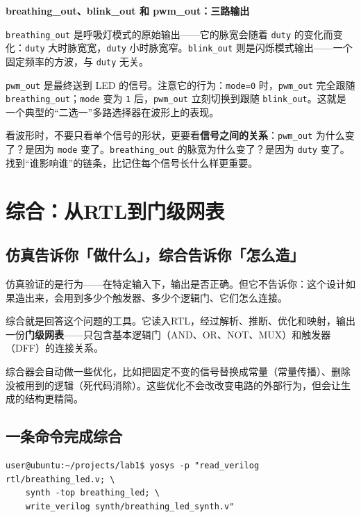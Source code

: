 \documentclass[11pt,a4paper]{article}
\begin{document}
\textbf{breathing\_out、blink\_out 和 pwm\_out：三路输出}

\texttt{breathing\_out} 是呼吸灯模式的原始输出——它的脉宽会随着 \texttt{duty} 的变化而变化：\texttt{duty} 大时脉宽宽，\texttt{duty} 小时脉宽窄。\texttt{blink\_out} 则是闪烁模式输出——一个固定频率的方波，与 \texttt{duty} 无关。

\texttt{pwm\_out} 是最终送到 LED 的信号。注意它的行为：\texttt{mode=0} 时，\texttt{pwm\_out} 完全跟随 \texttt{breathing\_out}；\texttt{mode} 变为 \texttt{1} 后，\texttt{pwm\_out} 立刻切换到跟随 \texttt{blink\_out}。这就是一个典型的``二选一''多路选择器在波形上的表现。

\begin{tipbox}
看波形时，不要只看单个信号的形状，更要看\textbf{信号之间的关系}：\texttt{pwm\_out} 为什么变了？是因为 \texttt{mode} 变了。\texttt{breathing\_out} 的脉宽为什么变了？是因为 \texttt{duty} 变了。找到``谁影响谁''的链条，比记住每个信号长什么样更重要。
\end{tipbox}

\section{综合：从RTL到门级网表}

\subsection{仿真告诉你「做什么」，综合告诉你「怎么造」}

仿真验证的是行为——在特定输入下，输出是否正确。但它不告诉你：这个设计如果造出来，会用到多少个触发器、多少个逻辑门、它们怎么连接。

综合就是回答这个问题的工具。它读入RTL，经过解析、推断、优化和映射，输出一份\textbf{门级网表}——只包含基本逻辑门（AND、OR、NOT、MUX）和触发器（DFF）的连接关系。

综合器会自动做一些优化，比如把固定不变的信号替换成常量（常量传播）、删除没被用到的逻辑（死代码消除）。这些优化不会改改变电路的外部行为，但会让生成的结构更精简。

\subsection{一条命令完成综合}

\begin{lstlisting}[style=shell]
user@ubuntu:~/projects/lab1$ yosys -p "read_verilog rtl/breathing_led.v; \
    synth -top breathing_led; \
    write_verilog synth/breathing_led_synth.v"
\end{lstlisting}
\end{document}
